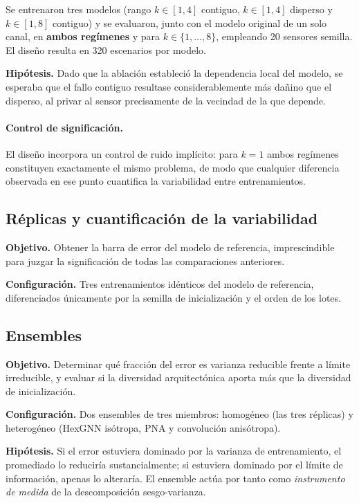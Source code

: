 Se entrenaron tres modelos (rango $k \in [1,4]$ contiguo, $k \in [1,4]$ disperso y $k \in [1,8]$
contiguo) y se evaluaron, junto con el modelo original de un solo canal, en \textbf{ambos regímenes}
y para $k \in \{1, \dots, 8\}$, empleando 20 sensores semilla. El diseño resulta en 320 escenarios
por modelo.

\textbf{Hipótesis.} Dado que la ablación estableció la dependencia local del modelo, se esperaba que
el fallo contiguo resultase considerablemente más dañino que el disperso, al privar al sensor
precisamente de la vecindad de la que depende.

\paragraph{Control de significación.} El diseño incorpora un control de ruido implícito: para $k=1$
ambos regímenes constituyen exactamente el mismo problema, de modo que cualquier diferencia
observada en ese punto cuantifica la variabilidad entre entrenamientos.

\subsection{Réplicas y cuantificación de la variabilidad}
\label{subsec:exp-replicas}

\textbf{Objetivo.} Obtener la barra de error del modelo de referencia, imprescindible para juzgar la
significación de todas las comparaciones anteriores.

\textbf{Configuración.} Tres entrenamientos idénticos del modelo de referencia, diferenciados
únicamente por la semilla de inicialización y el orden de los lotes.

\subsection{Ensembles}
\label{subsec:exp-ensemble}

\textbf{Objetivo.} Determinar qué fracción del error es varianza reducible frente a límite
irreducible, y evaluar si la diversidad arquitectónica aporta más que la diversidad de
inicialización.

\textbf{Configuración.} Dos ensembles de tres miembros: homogéneo (las tres réplicas) y heterogéneo
(HexGNN isótropa, PNA y convolución anisótropa).

\textbf{Hipótesis.} Si el error estuviera dominado por la varianza de entrenamiento, el promediado
lo reduciría sustancialmente; si estuviera dominado por el límite de información, apenas lo
alteraría. El ensemble actúa por tanto como \emph{instrumento de medida} de la descomposición
sesgo-varianza.

